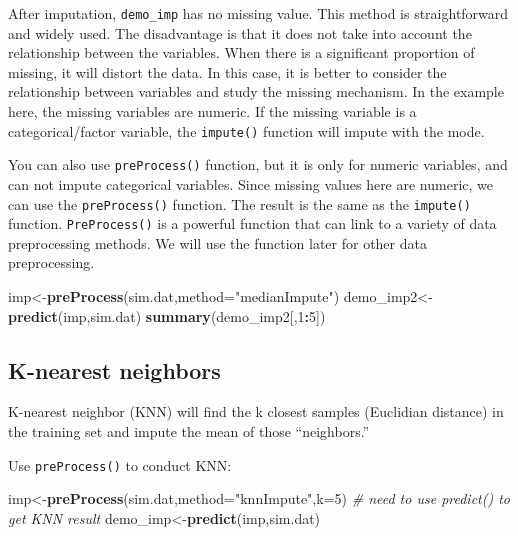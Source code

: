 \documentclass[12pt,]{krantz}
\makeatletter
\newenvironment{Shaded}{\begin{snugshade}}{\end{snugshade}}
\newcommand{\KeywordTok}[1]{\textcolor[rgb]{0.27,0.27,0.27}{\textbf{#1}}}
\newcommand{\DataTypeTok}[1]{\textcolor[rgb]{0.27,0.27,0.27}{#1}}
\newcommand{\DecValTok}[1]{\textcolor[rgb]{0.06,0.06,0.06}{#1}}
\newcommand{\StringTok}[1]{\textcolor[rgb]{0.5,0.5,0.5}{#1}}
\newcommand{\CommentTok}[1]{\textcolor[rgb]{0.37,0.37,0.37}{\textit{#1}}}
\newcommand{\OperatorTok}[1]{\textcolor[rgb]{0.43,0.43,0.43}{\textbf{#1}}}
\newcommand{\NormalTok}[1]{#1}
\newenvironment{kframe}{%
\medskip{}
\setlength{\fboxsep}{.8em}
 \def\at@end@of@kframe{}%
 \ifinner\ifhmode%
  \def\at@end@of@kframe{\end{minipage}}%
  \begin{minipage}{\columnwidth}%
 \fi\fi%
 \def\FrameCommand##1{\hskip\@totalleftmargin \hskip-\fboxsep
 \colorbox{shadecolor}{##1}\hskip-\fboxsep
     \hskip-\linewidth \hskip-\@totalleftmargin \hskip\columnwidth}%
 \MakeFramed {\advance\hsize-\width
   \@totalleftmargin\z@ \linewidth\hsize
   \@setminipage}}%
 {\par\unskip\endMakeFramed%
 \at@end@of@kframe}
\renewenvironment{Shaded}{\begin{kframe}}{\end{kframe}}
\theoremstyle{definition}
\theoremstyle{definition}
\theoremstyle{definition}
\theoremstyle{remark}
\makeatother
\begin{document}
After imputation, \texttt{demo\_imp} has no missing value. This method
is straightforward and widely used. The disadvantage is that it does not
take into account the relationship between the variables. When there is
a significant proportion of missing, it will distort the data. In this
case, it is better to consider the relationship between variables and
study the missing mechanism. In the example here, the missing variables
are numeric. If the missing variable is a categorical/factor variable,
the \texttt{impute()} function will impute with the mode.

You can also use \texttt{preProcess()} function, but it is only for
numeric variables, and can not impute categorical variables. Since
missing values here are numeric, we can use the \texttt{preProcess()}
function. The result is the same as the \texttt{impute()} function.
\texttt{PreProcess()} is a powerful function that can link to a variety
of data preprocessing methods. We will use the function later for other
data preprocessing.

\begin{Shaded}
\begin{Highlighting}[]
\NormalTok{imp<-}\KeywordTok{preProcess}\NormalTok{(sim.dat,}\DataTypeTok{method=}\StringTok{"medianImpute"}\NormalTok{)}
\NormalTok{demo_imp2<-}\KeywordTok{predict}\NormalTok{(imp,sim.dat)}
\KeywordTok{summary}\NormalTok{(demo_imp2[,}\DecValTok{1}\OperatorTok{:}\DecValTok{5}\NormalTok{])}
\end{Highlighting}
\end{Shaded}

\subsection{K-nearest neighbors}\label{k-nearest-neighbors}

K-nearest neighbor (KNN) will find the k closest samples (Euclidian
distance) in the training set and impute the mean of those
``neighbors.''

Use \texttt{preProcess()} to conduct KNN:

\begin{Shaded}
\begin{Highlighting}[]
\NormalTok{imp<-}\KeywordTok{preProcess}\NormalTok{(sim.dat,}\DataTypeTok{method=}\StringTok{"knnImpute"}\NormalTok{,}\DataTypeTok{k=}\DecValTok{5}\NormalTok{)}
\CommentTok{# need to use predict() to get KNN result}
\NormalTok{demo_imp<-}\KeywordTok{predict}\NormalTok{(imp,sim.dat)}
\end{Highlighting}
\end{Shaded}
\end{document}
